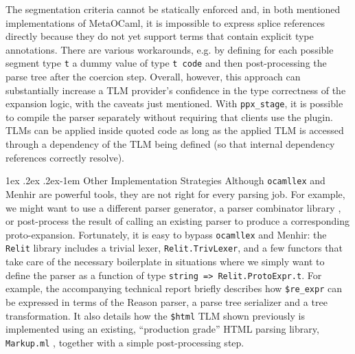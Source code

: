 \documentclass[acmsmall]{acmart}
\makeatletter
\renewcommand{\subsubsection}{%
  \@startsection{subsubsection}{3}%
  {\z@}{1ex \@plus .2ex \@minus .2ex}{-1em}%
  {\normalfont\normalsize\bfseries}%
}
\newcommand{\li}[1]{\lstinline[basicstyle=\ttfamily\fontsize{9pt}{1em}\selectfont]{#1}}
\makeatother
\begin{document}
The segmentation criteria cannot be statically enforced and, in both mentioned implementations of MetaOCaml, it is impossible to express splice references directly because they do not yet support terms that contain explicit type annotations. There are various workarounds, e.g. by defining for each possible segment type \li{t} a dummy value of type \li{t code} and then post-processing the parse tree after the coercion step. 
Overall, however, this approach can substantially increase a TLM provider's confidence in the type correctness of the expansion logic, with the caveats just mentioned. With \li{ppx_stage}, it is possible to compile the parser separately without requiring that clients use the plugin. 
TLMs can be applied inside quoted code as long as the applied TLM is accessed through a dependency of the TLM being defined (so that internal dependency references correctly resolve). %

\subsubsection{Other Implementation Strategies}
\label{sec:html-example}
Although \li{ocamllex} and Menhir are powerful tools, they are not right for every parsing job. For example, we might want to use a different parser generator, a parser combinator library \cite{Hutton1992d}, or post-process the result of calling an existing parser to produce a corresponding proto-expansion. Fortunately, it is easy to bypass \li{ocamllex} and Menhir: 
the \li{Relit} library includes a trivial lexer, \li{Relit.TrivLexer}, and a few functors that take care of the necessary boilerplate in situations where we simply want to define the parser as a function of type \li{string => Relit.ProtoExpr.t}. For example, the accompanying technical report briefly describes how \li{$re_expr} can be expressed in terms of the Reason parser, a parse tree serializer and a tree transformation. It also details how the \li{$html} TLM shown previously is implemented using an existing, ``production grade'' HTML parsing library, \li{Markup.ml} \cite{markupml}, together with a simple post-processing step.
\end{document}
